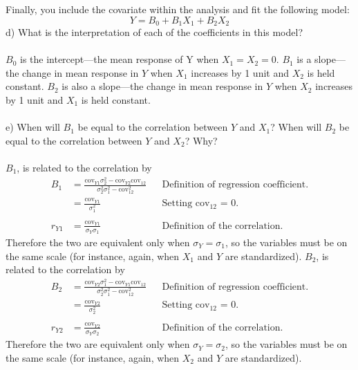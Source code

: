 \documentclass[onecolumn,10pt]{jhwhw}
\begin{document}
Finally, you include the covariate within the analysis and fit the following model:
                $$Y = B_0 + B_1 X_1 + B_2 X_2$$
d) What is the interpretation of each of the coefficients in this model?\\
\\
$B_0$ is the intercept---the mean response of Y when $X_1 = X_2 = 0$. $B_1$ is a slope---the change in mean response in $Y$ when $X_1$ increases by 1 unit and $X_2$ is held constant. $B_2$ is also a slope---the change in mean response in $Y$ when $X_2$ increases by 1 unit and $X_1$ is held constant. \\
\\
e) When will $B_1$ be equal to the correlation between $Y$ and $X_1$? When will $B_2$ be equal to the correlation between $Y$ and $X_2$? Why?\\
\\
$B_1$, is related to the correlation by
\begin{align*}
B_1 &= \frac{\mbox{cov}_{Y1} \sigma_2^2 - \mbox{cov}_{Y2} \mbox{cov}_{12}}{\sigma_{2}^2 \sigma_1^2 - \mbox{cov}_{12}^2}  && \text{Definition of regression coefficient.}\\
    &= \frac{\mbox{cov}_{Y1}}{\sigma_{1}^2} && \text{Setting cov$_{12}$ = 0.} \\
\\
r_{Y1}  &= \frac{\mbox{cov}_{Y1}}{\sigma_Y \sigma_1} && \text{Definition of the correlation.}
\end{align*}
Therefore the two are equivalent only when $\sigma_{Y} = \sigma_{1}$, so the variables must be on the same scale (for instance, again, when $X_1$ and $Y$ are standardized). $B_2$, is related to the correlation by
\begin{align*}
B_2 &= \frac{\mbox{cov}_{Y2} \sigma_1^2 - \mbox{cov}_{Y1} \mbox{cov}_{12}}{\sigma_{2}^2 \sigma_1^2 - \mbox{cov}_{12}^2} && \text{Definition of regression coefficient.} \\
    &= \frac{\mbox{cov}_{Y2}}{\sigma_{2}^2} && \text{Setting cov$_{12}$ = 0.} \\
\\
r_{Y2}  &= \frac{\mbox{cov}_{Y2}}{\sigma_Y \sigma_2} && \text{Definition of the correlation.}
\end{align*}
Therefore the two are equivalent only when $\sigma_{Y} = \sigma_{2}$, so the variables must be on the same scale (for instance, again, when $X_2$ and $Y$ are standardized).\\
\\
\end{document}

